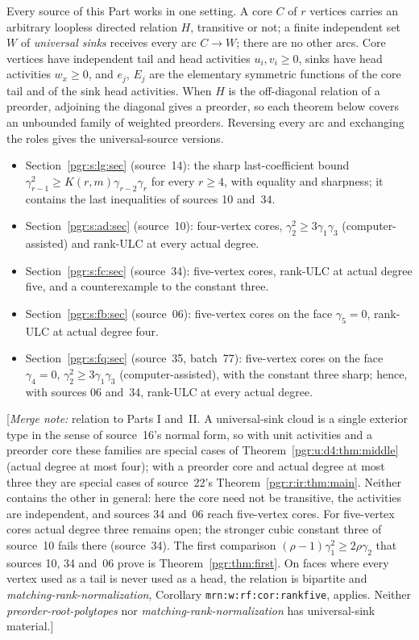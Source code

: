 \documentclass[11pt]{article}
\numberwithin{equation}{section}
\theoremstyle{definition}\newtheorem{definition}[theorem]{Definition}\newtheorem{remark}[theorem]{Remark}
\newcommand{\mnote}[1]{[\textit{Merge note:} #1]}
\newcommand{\prp}{\emph{preorder-root-polytopes}}
\newcommand{\mrn}{\emph{matching-rank-normalization}}
\begin{document}
Every source of this Part works in one setting. A core $C$ of $r$ vertices
carries an arbitrary loopless directed relation $H$, transitive or not; a
finite independent set $W$ of \emph{universal sinks} receives every arc
$C\to W$; there are no other arcs. Core vertices have independent tail and
head activities $u_i,v_i\ge0$, sinks have head activities $w_x\ge0$, and
$e_j$, $E_j$ are the elementary symmetric functions of the core tail and
of the sink head activities. When $H$ is the off-diagonal relation of a
preorder, adjoining the diagonal gives a preorder, so each theorem below
covers an unbounded family of weighted preorders. Reversing every arc and
exchanging the roles gives the universal-source versions.
\begin{itemize}[leftmargin=*]
\item Section~\ref{pgr:s:lg:sec} (source~14): the sharp last-coefficient
  bound $\gamma_{r-1}^2\ge K(r,m)\gamma_{r-2}\gamma_r$ for every
  $r\ge4$, with equality and sharpness; it contains the last inequalities
  of sources 10 and~34.
\item Section~\ref{pgr:s:ad:sec} (source~10): four-vertex cores,
  $\gamma_2^2\ge3\gamma_1\gamma_3$ (computer-assisted) and rank-ULC at
  every actual degree.
\item Section~\ref{pgr:s:fc:sec} (source~34): five-vertex cores, rank-ULC
  at actual degree five, and a counterexample to the constant three.
\item Section~\ref{pgr:s:fb:sec} (source~06): five-vertex cores on the face
  $\gamma_5=0$, rank-ULC at actual degree four.
\item Section~\ref{pgr:s:fq:sec} (source~35, batch~77): five-vertex cores
  on the face $\gamma_4=0$, $\gamma_2^2\ge3\gamma_1\gamma_3$
  (computer-assisted), with the constant three sharp; hence, with sources
  06 and~34, rank-ULC at every actual degree.
\end{itemize}
\mnote{relation to Parts I and~II. A universal-sink cloud is a single
exterior type in the sense of source~16's normal form, so with unit
activities and a preorder core these families are special cases of
Theorem~\ref{pgr:u:d4:thm:middle} (actual degree at most four); with a
preorder core and actual degree at most three they are special cases of
source~22's Theorem~\ref{pgr:r:ir:thm:main}. Neither contains the other in
general: here the core need not be transitive, the activities are
independent, and sources 34 and~06 reach five-vertex cores. For five-vertex
cores actual degree three remains open; the stronger cubic constant three
of source~10 fails there (source~34). The first comparison
$(\rho-1)\gamma_1^2\ge2\rho\gamma_2$ that sources 10, 34 and~06 prove is
Theorem~\ref{pgr:thm:first}. On faces where every vertex used as a tail is
never used as a head, the relation is bipartite and \mrn, Corollary
\texttt{mrn:w:rf:cor:rankfive}, applies. Neither \prp{} nor \mrn{} has
universal-sink material.}
\end{document}
